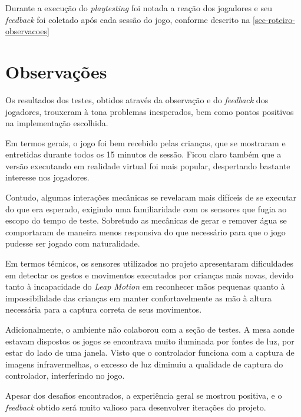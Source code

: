 Durante a execução do \textit{playtesting} foi notada a reação dos 
jogadores e seu \textit{feedback} foi coletado após cada sessão do jogo, 
conforme descrito na \autoref{sec-roteiro-observacoes}

\section{Observações}\label{sec-roteiro-observacoes}

Os resultados dos testes, obtidos através da observação e do 
\textit{feedback} dos jogadores, trouxeram à tona problemas inesperados, 
bem como pontos positivos na implementação escolhida.

Em termos gerais, o jogo foi bem recebido pelas crianças, que se 
mostraram e entretidas durante todos os 15 minutos de sessão. Ficou claro 
também que a versão executando em realidade virtual foi mais popular, 
despertando bastante interesse nos jogadores.

Contudo, algumas interações mecânicas se revelaram mais difíceis de se 
executar do que era esperado, exigindo uma familiaridade com os sensores 
que fugia ao escopo do tempo de teste. Sobretudo as mecânicas de gerar e 
remover água se comportaram de maneira menos responsiva do que necessário 
para que o jogo pudesse ser jogado com naturalidade.

Em termos técnicos, os sensores utilizados no projeto apresentaram 
dificuldades em detectar os gestos e movimentos executados por crianças 
mais novas, devido tanto à incapacidade do \textit{Leap Motion} em 
reconhecer mãos pequenas quanto à impossibilidade das crianças em 
manter confortavelmente as mão à altura necessária para a captura 
correta de seus movimentos. 

Adicionalmente, o ambiente não colaborou com a seção de testes. A mesa 
aonde estavam dispostos os jogos se encontrava muito iluminada por 
fontes de luz, por estar do lado de uma janela. Visto que o controlador 
funciona com a captura de imagens infravermelhas, o excesso de luz 
diminuiu a qualidade de captura do controlador, interferindo no jogo.

Apesar dos desafios encontrados, a experiência geral se mostrou 
positiva, e o \textit{feedback} obtido será muito valioso para desenvolver 
iterações do projeto.

